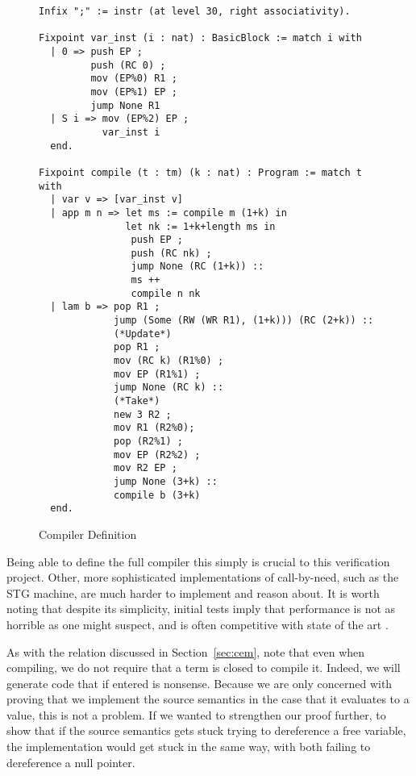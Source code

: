 \begin{figure}
\begin{lstlisting}
Infix ";" := instr (at level 30, right associativity).

Fixpoint var_inst (i : nat) : BasicBlock := match i with
  | 0 => push EP ;
         push (RC 0) ;
         mov (EP%0) R1 ;
         mov (EP%1) EP ;
         jump None R1
  | S i => mov (EP%2) EP ;
           var_inst i
  end.

Fixpoint compile (t : tm) (k : nat) : Program := match t with
  | var v => [var_inst v]
  | app m n => let ms := compile m (1+k) in
               let nk := 1+k+length ms in
                push EP ;
                push (RC nk) ;
                jump None (RC (1+k)) ::
                ms ++
                compile n nk
  | lam b => pop R1 ;
             jump (Some (RW (WR R1), (1+k))) (RC (2+k)) ::
             (*Update*)
             pop R1 ;
             mov (RC k) (R1%0) ;
             mov EP (R1%1) ;
             jump None (RC k) ::
             (*Take*)
             new 3 R2 ;
             mov R1 (R2%0);
             pop (R2%1) ;
             mov EP (R2%2) ;
             mov R2 EP ;
             jump None (3+k) ::
             compile b (3+k)
  end. 
\end{lstlisting}
\caption{Compiler Definition}
\label{fig:compiler}
\end{figure}

Being able to define the full compiler this simply is crucial to this
verification project. Other, more sophisticated implementations of call-by-need,
such as the STG machine, are much harder to implement and reason about. It is
worth noting that despite its simplicity, initial tests imply that performance
is not as horrible as one might suspect, and is often competitive with state of
the art \cite{cem}.

As with the relation discussed in Section~\ref{sec:cem}, note that even when
compiling, we do not require that a term is closed to compile it. Indeed, we
will generate code that if entered is nonsense. Because we are only concerned
with proving that we implement the source semantics in the case that it
evaluates to a value, this is not a problem. If we wanted to strengthen our
proof further, to show that if the source semantics gets stuck trying to
dereference a free variable, the implementation would get stuck in the same way,
with both failing to dereference a null pointer.    
